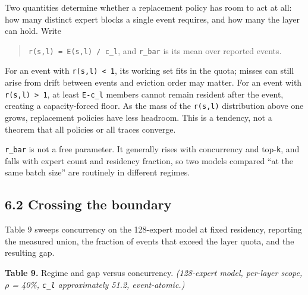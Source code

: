 \documentclass[
  10pt,
  letterpaper,
  10pt]{article}
\begin{document}
Two quantities determine whether a replacement policy has room to act at
all: how many distinct expert blocks a single event requires, and how
many the layer can hold. Write

\begin{quote}
\texttt{r(s,l)\ =\ \textbar{}E(s,l)\textbar{}\ /\ c\_l}, and
\texttt{r\_bar} is its mean over reported events.
\end{quote}

For an event with \texttt{r(s,l)\ \textless{}\ 1}, its working set fits
in the quota; misses can still arise from drift between events and
eviction order may matter. For an event with
\texttt{r(s,l)\ \textgreater{}\ 1}, at least
\texttt{\textbar{}E\textbar{}-c\_l} members cannot remain resident after
the event, creating a capacity-forced floor. As the mass of the
\texttt{r(s,l)} distribution above one grows, replacement policies have
less headroom. This is a tendency, not a theorem that all policies or
all traces converge.

\texttt{r\_bar} is not a free parameter. It generally rises with
concurrency and top-\texttt{k}, and falls with expert count and
residency fraction, so two models compared ``at the same batch size''
are routinely in different regimes.

\subsection{6.2 Crossing the boundary}\label{crossing-the-boundary}

Table 9 sweeps concurrency on the 128-expert model at fixed residency,
reporting the measured union, the fraction of events that exceed the
layer quota, and the resulting gap.

\textbf{Table 9.} Regime and gap versus concurrency. \emph{(128-expert
model, per-layer scope, \ensuremath{\rho} = 40\%, \texttt{c\_l}
approximately 51.2, event-atomic.)}
\end{document}
